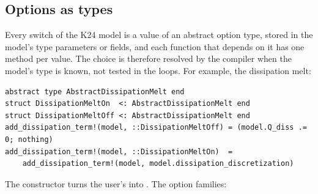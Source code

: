 \subsection{Options as types}\label{arch:options}
Every switch of the K24 model is a value of an abstract option type, stored in the model's type parameters or fields,
and each function that depends on it has one method per value. The choice is therefore resolved by the compiler
when the model's type is known, not tested in the loops. For example, the dissipation melt:
\begin{verbatim}
abstract type AbstractDissipationMelt end
struct DissipationMeltOn  <: AbstractDissipationMelt end
struct DissipationMeltOff <: AbstractDissipationMelt end
add_dissipation_term!(model, ::DissipationMeltOff) = (model.Q_diss .= 0; nothing)
add_dissipation_term!(model, ::DissipationMeltOn)  =
    add_dissipation_term!(model, model.dissipation_discretization)
\end{verbatim}
The constructor turns the user's  into . The option families:
